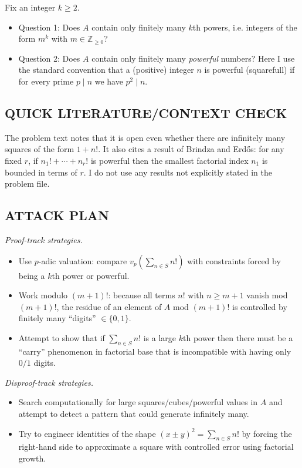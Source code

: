 Fix an integer $k\ge 2$.
\begin{itemize}
\item Question 1: Does $A$ contain only finitely many $k$th powers, i.e. integers of the form $m^k$ with $m\in\mathbb{Z}_{\ge 0}$?
\item Question 2: Does $A$ contain only finitely many \emph{powerful} numbers?
Here I use the standard convention that a (positive) integer $n$ is powerful (squarefull) if for every prime $p\mid n$ we have $p^2\mid n$.
\end{itemize}

\subsection*{QUICK LITERATURE/CONTEXT CHECK}
The problem text notes that it is open even whether there are infinitely many squares of the form $1+n!$. It also cites a result of Brindza and Erd\H{o}s: for any fixed $r$, if $n_1!+\cdots+n_r!$ is powerful then the smallest factorial index $n_1$ is bounded in terms of $r$.
I do not use any results not explicitly stated in the problem file.

\subsection*{ATTACK PLAN}
\emph{Proof-track strategies.}
\begin{itemize}
\item Use $p$-adic valuation: compare $v_p\left(\sum_{n\in S} n!\right)$ with constraints forced by being a $k$th power or powerful.
\item Work modulo $(m+1)!$: because all terms $n!$ with $n\ge m+1$ vanish mod $(m+1)!$, the residue of an element of $A$ mod $(m+1)!$ is controlled by finitely many ``digits'' $\in\{0,1\}$.
\item Attempt to show that if $\sum_{n\in S} n!$ is a large $k$th power then there must be a ``carry'' phenomenon in factorial base that is incompatible with having only $0/1$ digits.
\end{itemize}

\emph{Disproof-track strategies.}
\begin{itemize}
\item Search computationally for large squares/cubes/powerful values in $A$ and attempt to detect a pattern that could generate infinitely many.
\item Try to engineer identities of the shape $(x\pm y)^2 = \sum_{n\in S} n!$ by forcing the right-hand side to approximate a square with controlled error using factorial growth.
\end{itemize}

